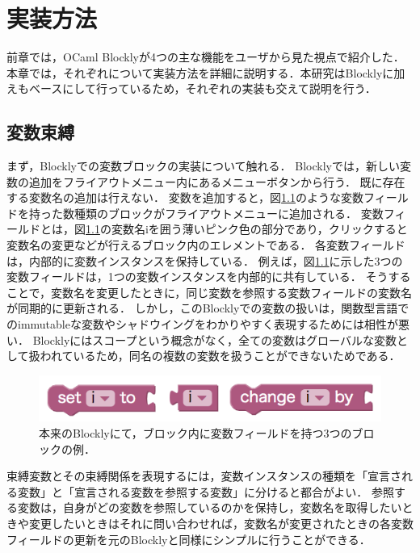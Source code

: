 \chapter{実装方法}\label{chap:impl}

前章では，OCaml Blocklyが4つの主な機能をユーザから見た視点で紹介した．
本章では，それぞれについて実装方法を詳細に説明する．本研究はBlocklyに加え\cite{Typed-Blockly}もベースにして行っているため，それぞれの実装も交えて説明を行う．

\section {変数束縛\label{impl:boundVariable}}

まず，Blocklyでの変数ブロックの実装について触れる．
Blocklyでは，新しい変数の追加をフライアウトメニュー内にあるメニューボタンから行う．
既に存在する変数名の追加は行えない．
変数を追加すると，図\ref{fig:blocklyVar}のような変数フィールドを持った数種類のブロックがフライアウトメニューに追加される．
変数フィールドとは，図\ref{fig:blocklyVar}の変数名iを囲う薄いピンク色の部分であり，クリックすると変数名の変更などが行えるブロック内のエレメントである．
各変数フィールドは，内部的に変数インスタンスを保持している．
例えば，図\ref{fig:blocklyVar}に示した3つの変数フィールドは，1つの変数インスタンスを内部的に共有している．
そうすることで，変数名を変更したときに，同じ変数を参照する変数フィールドの変数名が同期的に更新される．
しかし，このBlocklyでの変数の扱いは，関数型言語でのimmutableな変数やシャドウイングをわかりやすく表現するためには相性が悪い．
Blocklyにはスコープという概念がなく，全ての変数はグローバルな変数として扱われているため，同名の複数の変数を扱うことができないためである．

\begin{figure}[h]
 \centering
 \includegraphics[keepaspectratio, scale=0.3]{img/iVar.png}
 \caption{本来のBlocklyにて，ブロック内に変数フィールドを持つ3つのブロックの例．\label{fig:blocklyVar}}
\end{figure}

束縛変数とその束縛関係を表現するには，変数インスタンスの種類を「宣言される変数」と「宣言される変数を参照する変数」に分けると都合がよい．
参照する変数は，自身がどの変数を参照しているのかを保持し，変数名を取得したいときや変更したいときはそれに問い合わせれば，変数名が変更されたときの各変数フィールドの更新を元のBlocklyと同様にシンプルに行うことができる．

